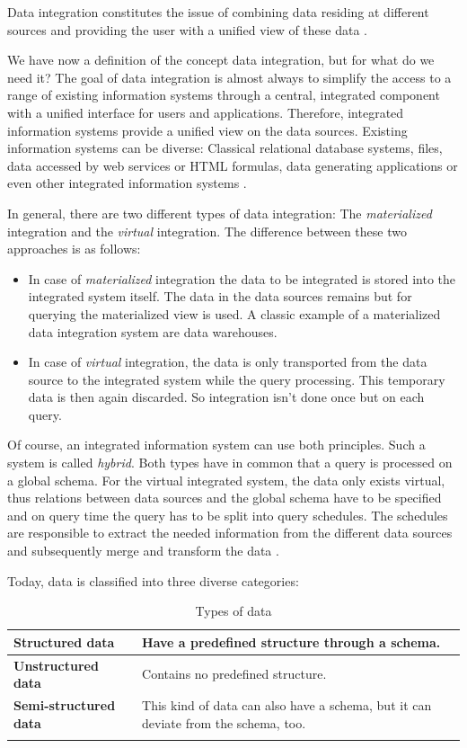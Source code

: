 Data integration constitutes the issue of combining data residing at different sources and providing the user with a unified view of these data \cite{Lenzerini:2002:DIT:543613.543644}. 

We have now a definition of the concept data integration, but for what do we need it? The goal of data integration is almost always to simplify the access to a range of existing information systems through a central, integrated component with a unified interface for users and applications. Therefore, integrated information systems provide a unified view on the data sources. Existing information systems can be diverse: Classical relational database systems, files, data accessed by web services or HTML formulas, data generating applications or even other integrated information systems \cite[p. 3-4]{DBLP:books/dp/LeserN2006}.

In general, there are two different types of data integration: The \emph{materialized} integration and the \emph{virtual} integration. The difference between these two approaches is as follows:
\begin{itemize}
 \item \label{materialized_index}In case of \emph{materialized} integration the data to be integrated is stored  into the integrated system itself. The data in the data sources remains but for querying the materialized view is used. A classic example of a materialized data integration system are data warehouses.
 \item \label{virtual_index}In case of \emph{virtual} integration, the data is only transported from the data source to the integrated system while the query processing. This temporary data is then again discarded. So integration isn't done once but on each query.
\end{itemize}
Of course, an integrated information system can use both principles. Such a system is called \emph{hybrid}\label{hybrid_index}. Both types have in common that a query is processed on a global schema. For the virtual integrated system, the data only exists virtual, thus relations between data sources and the global schema have to be specified and on query time the query has to be split into query schedules. The schedules are responsible to extract the needed information from the different data sources and subsequently merge and transform the data \cite[p. 86-88]{DBLP:books/dp/LeserN2006}.

Today, data is classified into three diverse categories:
\begin{longtable}{|l|p{}|}
\hline
 \textbf{Structured data}  &  Have a predefined structure through a schema.\\ \hline
 \textbf{Unstructured data}    &  Contains no predefined structure.\\ \hline
 \textbf{Semi-structured data} & This kind of data can also have a schema, but it can deviate from the schema, too.\\ \hline
\caption{Types of data \cite[p. 17]{DBLP:books/dp/LeserN2006}}
\label{type_of_data_label}
\end{longtable}

